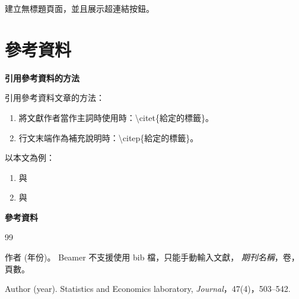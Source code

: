 \documentclass[12pt, aspectratio=43]{beamer}
\begin{document}
\begin{frame}
	建立無標題頁面，並且展示超連結按鈕。
	
	\bigskip
	
	\hyperlink{連結的文字}{}
\end{frame}


\section{參考資料}


\linespread{1}  %
\begin{frame}{\textbf{引用參考資料的方法}}
\linespread{1.5} %

	引用參考資料文章的方法：
	
	\begin{enumerate}[1]
		\item 將文獻作者當作主詞時使用時：\textbackslash citet\{給定的標籤\}。
		\item 行文末端作為補充說明時：\textbackslash citep\{給定的標籤\}。
	\end{enumerate}
	
	\bigskip
	
	以本文為例：
	
	\begin{enumerate}[1]
		\item \citet{中文文獻範例} 與 \citet{English_example}
		\item \citep{中文文獻範例} 與 \citep{English_example}
	\end{enumerate}
	
\end{frame}


\linespread{1}  %
\begin{frame}{\textbf{參考資料}}
\linespread{1.5} %

\footnotesize

\begin{thebibliography}{99} 

		作者 (年份)。 %
		\newblock Beamer 不支援使用 bib 檔，只能手動輸入文獻， %
		\newblock \emph{期刊名稱}，卷，頁數。 %

		Author (year). %
		\newblock Statistics and Economics laboratory,
		\newblock \emph{Journal}，47(4)，503--542.
		
\end{thebibliography}

\end{frame}
\end{document}
